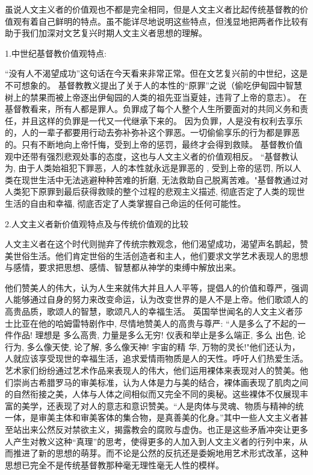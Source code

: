 \documentclass[UTF8]{ctexart}
\begin{document}
    虽说人文主义者的价值观也不都是完全相同，但是人文主义者比起传统基督教的价值观有着自己鲜明的特点。虽不能详尽地说明这些特点，但浅显地把两者作比较有助于我们加深对文艺复兴时期人文主义者思想的理解。\par
    1.中世纪基督教价值观特点:\par
    “没有人不渴望成功”这句话在今天看来非常正常。但在文艺复兴前的中世纪，这是不可想象的。
    基督教教义提出了关于人的本性的“原罪”之说（偷吃伊甸园中智慧树上的禁果而被上帝逐出伊甸园的人类的祖先亚当夏娃，违背了上帝的意志）。
    在基督教看来，所有人都是罪人。负罪成了每个人整个人生所要面对的共同义务和责任，并且这样的负罪是一代又一代继承下来的。
    因为负罪，人是没有权利去享乐的，人的一辈子都要用行动去弥补弥补这个罪恶。一切偷偷享乐的行为都是罪恶的。只有不断地向上帝忏悔，受到上帝的惩罚，最终才会得到救赎。
    基督教价值观中还带有强烈悲观处事的态度，这也与人文主义者的价值观相反。
    “基督教认为, 由于人类始祖犯下罪恶，人的本性就永远是罪恶的 , 受到上帝的惩罚, 所以人类在现世生活中无法逃避种种苦难的折磨, 无法救助自己脱离苦难。"\footnotemark[2]
    基督教通过对人类犯下原罪到最后获得救赎的整个过程的悲观主义描述, 彻底否定了人类的现世生活的自由和幸福, 彻底否定了人类掌握自己命运的任何可能性。\par
    2.人文主义者新价值观特点及与传统价值观的比较\par
    人文主义者在这个时代则抛弃了传统宗教观念，他们渴望成功，渴望声名鹊起，赞美世俗生活。他们肯定世俗的生活创造者和主人，他们要求文学艺术表现人的思想与感情，要求把思想、感情、智慧都从神学的束缚中解放出来。\par
    他们赞美人的伟大，认为人生来就伟大并且人人平等，提倡人的价值和尊严，强调人能够通过自身的努力来改变命运，认为改变世界的是人不是上帝。他们歌颂人的高贵品质，歌颂人的智慧，歌颂凡人的幸福生活。
    英国举世闻名的人文主义者莎士比亚在他的哈姆雷特剧作中, 尽情地赞美人的高贵与尊严: “人是多么了不起的一件作品! 理想是
多么高贵, 力量是多么无穷! 仪表和举止是多么端正, 多么
出色, 论行为, 多么像天使, 论了解, 多么像天神! 宇宙的精
华, 万物的灵长!"\footnotemark[3]
    他们还认为，人就应该享受现世的幸福生活，追求爱情雨物质是人的天性。呼吁人们热爱生活。
    艺术家们纷纷通过艺术作品来表现人的伟大，他们运用裸体来表现对人的赞美。他们崇尚古希腊罗马的审美标准，认为人体是力与美的结合，裸体画表现了肌肉之间的自然衔接之美，人体与人体之间相似而又完全不同的奥秘。这些裸体不仅展现丰富的美学，还表现了对人的意志和意识赞美。“人是肉体与灵魂、物质与精神的统一体，是审美主体和审美客体的集合物，是真善美的化身。”\footnotemark[4]
    其中一些人文主义者甚至站出来公然反对禁欲主义，揭露教会的腐败与虚伪。也正是这些矛盾冲突让更多人产生对教义这种“真理”的思考，使得更多的人加入到人文主义者的行列中来，从而推进了新的思想的萌芽。而不论是公然的反抗还是委婉地用艺术形式改革，这种思想已完全不是传统基督教那种毫无理性毫无人性的模样。\par
    
\end{document}
